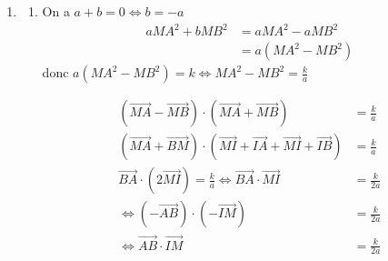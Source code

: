 \documentclass[12pt,a4paper]{article}
\begin{document}
\begin{enumerate}
    \item 
    \begin{enumerate}
    \item On a $a + b = 0 \iff b = -a$
    \begin{align*}
    a MA^2 + b MB^2 &= a MA^2 - a MB^2 \\
    &= a \left( MA^2 - MB^2 \right)
    \end{align*}
    donc $a \left( MA^2 - MB^2 \right) = k \iff MA^2 - MB^2 = \frac{k}{a}$

    \begin{align*}
    \left(\overrightarrow{MA} - \overrightarrow{MB}\right) \cdot \left(\overrightarrow{MA} + \overrightarrow{MB}\right) &= \frac{k}{a} \\
    \left(\overrightarrow{MA} + \overrightarrow{BM}\right) \cdot \left(\overrightarrow{MI} + \overrightarrow{IA} + \overrightarrow{MI} + \overrightarrow{IB}\right) &= \frac{k}{a} \\
    \overrightarrow{BA} \cdot \left(2\overrightarrow{MI}\right) = \frac{k}{a} \iff \overrightarrow{BA} \cdot \overrightarrow{MI} &= \frac{k}{2a} \\
    \iff \left(-\overrightarrow{AB}\right) \cdot \left(-\overrightarrow{IM}\right) &= \frac{k}{2a} \\
    \iff \overrightarrow{AB} \cdot \overrightarrow{IM} &= \frac{k}{2a}
    \end{align*}


\end{enumerate}
\end{enumerate}
\end{document}
